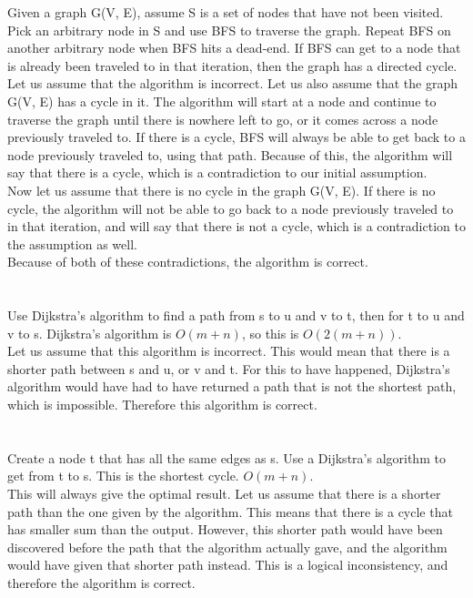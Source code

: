 \documentclass[14pt]{extarticle}
\begin{document}
Given a graph G(V, E), assume S is a set of nodes that have not been visited. Pick an arbitrary node in S and use BFS to traverse the graph. Repeat BFS on another arbitrary node when BFS hits a dead-end. If BFS can get to a node that is already been traveled to in that iteration, then the graph has a directed cycle.\\

Let us assume that the algorithm is incorrect.
Let us also assume that the graph G(V, E) has a cycle in it. The algorithm will start at a node and continue to traverse the graph until there is nowhere left to go, or it comes across a node previously traveled to. If there is a cycle, BFS will always be able to get back to a node previously traveled to, using that path. Because of this, the algorithm will say that there is a cycle, which is a contradiction to our initial assumption. \\
Now let us assume that there is no cycle in the graph G(V, E). If there is no cycle, the algorithm will not be able to go back to a node previously traveled to in that iteration, and will say that there is not a cycle, which is a contradiction to the assumption as well. \\
Because of both of these contradictions, the algorithm is correct.

\section{}

Use Dijkstra's algorithm to find a path from s to u and v to t, then for t to u and v to s. Dijkstra's algorithm is $O(m+n)$, so this is $O(2(m+n))$.\\

Let us assume that this algorithm is incorrect. This would mean that there is a shorter path between s and u, or v and t. For this to have happened, Dijkstra's algorithm would have had to have returned a path that is not the shortest path, which is impossible. Therefore this algorithm is correct.

\section{}

Create a node t that has all the same edges as s. Use a Dijkstra's algorithm to get from t to s. This is the shortest cycle. $O(m+n)$. \\
This will always give the optimal result. Let us assume that there is a shorter path than the one given by the algorithm. This means that there is a cycle that has smaller sum than the output. However, this shorter path would have been discovered before the path that the algorithm actually gave, and the algorithm would have given that shorter path instead. This is a logical inconsistency, and therefore the algorithm is correct.
\end{document}
